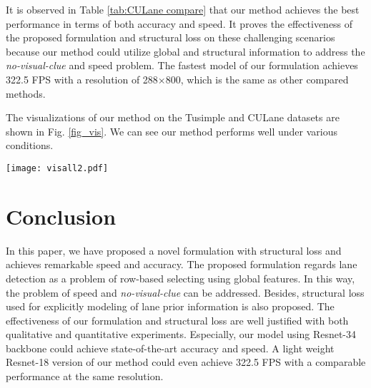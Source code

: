 \documentclass[runningheads]{llncs}
\begin{document}
It is observed in Table \ref{tab:CULane compare} that our method achieves the best performance  in terms of both accuracy and speed. It proves the effectiveness of the proposed formulation and structural loss on these challenging scenarios because our method could utilize global and structural information to address the \textit{no-visual-clue} and speed problem. The fastest model of our formulation achieves 322.5 FPS with a resolution of 288$\times$800, which is the same as other compared methods.

The visualizations of our method on the Tusimple and CULane datasets are shown in Fig. \ref{fig_vis}. We can see our method performs well under various conditions. \vspace{-5pt}
\begin{figure*}[t]

	\centering
	\texttt{[image: visall2.pdf]}
	\caption{Visualization on the Tusimple and the CULane dataset. The first two rows are results on the Tusimple dataset and the rest rows are results on the CULane dataset. From left to right, the results are image, prediction and label. In the image, predictions are marked in blue and ground truth are marked in red. Because our method only predicts on the predefined row anchors, the scales of images and labels in the vertical direction are not identical.}
	\label{fig_vis}
	\vspace{-15pt}
\end{figure*}

\section{Conclusion}



In this paper, we have proposed a novel formulation with structural loss and achieves remarkable speed and accuracy. The proposed formulation regards lane detection as a problem of row-based selecting using global features. In this way, the problem of speed and \textit{no-visual-clue} can be addressed. Besides, structural loss used for explicitly modeling of lane prior information is also proposed. The effectiveness of our formulation and structural loss are well justified with both qualitative and quantitative experiments. Especially, our model using Resnet-34 backbone could achieve state-of-the-art accuracy and speed. A light weight Resnet-18 version of our method could even achieve 322.5 FPS with a comparable performance at the same resolution.

\clearpage




\end{document}
